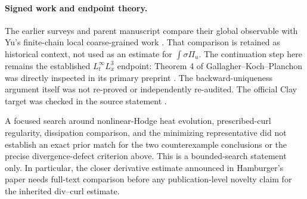 \documentclass[11pt,a4paper]{article}
\theoremstyle{definition}
\theoremstyle{remark}
\numberwithin{equation}{section}
\begin{document}
\paragraph{Signed work and endpoint theory.}
The earlier surveys and parent manuscript compare their global observable with Yu's finite-chain local coarse-grained work \cite{Yu}. That comparison is retained as historical context, not used as an estimate for \(\int\sigma\Pi_u\). The continuation step here remains the established \(L^\infty_tL^3_x\) endpoint: Theorem 4 of Gallagher--Koch--Planchon was directly inspected in its primary preprint \cite{GKP}. The backward-uniqueness argument itself was not re-proved or independently re-audited. The official Clay target was checked in the source statement \cite{Clay}.

A focused search around nonlinear-Hodge heat evolution, prescribed-curl regularity, dissipation comparison, and the minimizing representative did not establish an exact prior match for the two counterexample conclusions or the precise divergence-defect criterion above. This is a bounded-search statement only. In particular, the closer derivative estimate announced in Hamburger's paper needs full-text comparison before any publication-level novelty claim for the inherited div--curl estimate.
\end{document}
